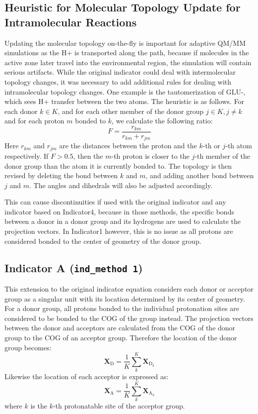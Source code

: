 \documentclass{article}
\newcommand{\mb}[1]{\mathbf{#1}}
\newcommand{\mr}[1]{\mathrm{#1}}
\begin{document}
\subsection{Heuristic for Molecular Topology Update for Intramolecular Reactions}\label{ss:topo_change}
Updating the molecular topology on-the-fly is important for adaptive QM/MM simulations as the H+ is transported along the path, because if molecules in the active zone later travel into the environmental region, the simulation will contain serious artifacts.
While the original indicator could deal with intermolecular topology changes, it was necessary to add additional rules for dealing with intramolecular topology changes.
One example is the tautomerization of GLU-, which sees H+ transfer between the two atoms.
The heuristic is as follows.
For each donor $k \in K$, and for each other member of the donor group $j \in K, j \ne k$ and for each proton $m$ bonded to $k$, we calculate the following ratio:
\begin{equation}\label{eq:ratio}
F = \frac{r_{km}}{r_{km} + r_{jm}}
\end{equation}
Here $r_{km}$ and $r_{jm}$ are the distances between the proton and the $k$-th or $j$-th atom respectively.
If $F > 0.5$, then the $m$-th proton is closer to the $j$-th member of the donor group than the atom it is currently bonded to.
The topology is then revised by deleting the bond between $k$ and $m$, and adding another bond between $j$ and $m$.
The angles and dihedrals will also be adjusted accordingly.

This can cause discontinuities if used with the original indicator and any indicator based on Indicator4, because in those methods, the specific bonds between a donor in a donor group and its hydrogens are used to calculate the projection vectors.
In Indicator1 however, this is no issue as all protons are considered bonded to the center of geometry of the donor group.

\subsection{Indicator A (\texttt{ind\_method 1})}\label{ss:ind_a}
This extension to the original indicator equation considers each donor or acceptor group as a singular unit with its location determined by its center of geometry.
For a donor group, all protons bonded to the individual protonation sites are considered to be bonded to the COG of the group instead.
The projection vectors between the donor and acceptors are calculated from the COG of the donor group to the COG of an acceptor group.
Therefore the location of the donor group becomes:
\begin{equation}\label{eq:donor_cog}
\mb{X}_{\mr{D}} = \frac{1}{K}\sum_k^K \mb{X}_{\mr{D}_k}
\end{equation}
Likewise the location of each acceptor is expressed as:
\begin{equation}
\mb{X}_{\mr{A}} = \frac{1}{K}\sum_k^K \mb{X}_{\mr{A}_k}
\end{equation}
where $k$ is the $k$-th protonatable site of the acceptor group.
\end{document}

